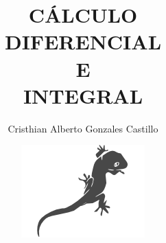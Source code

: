 \documentclass[12pt,a4paper]{book}
\theoremstyle{plain}
\theoremstyle{definition}
\theoremstyle{remark}
\begin{document}
\title{CÁLCULO\\ DIFERENCIAL\\ E\\ INTEGRAL}
\author{\small Cristhian Alberto Gonzales Castillo}
\date{\vspace{3cm}\includegraphics{logo.png}}


\frenchspacing
\raggedbottom


\frontmatter

\maketitle
\tableofcontents

\mainmatter








\end{document}
